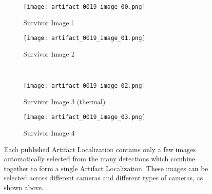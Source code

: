 \begin{figure}
	\centering
	\begin{subfigure}{0.45\textwidth}
		\texttt{[image: artifact\_0019\_image\_00.png]}
		\caption{Survivor Image 1}
		\label{survivor_image_1}
	\end{subfigure}		
	\hfill
	\begin{subfigure}{0.45\textwidth}
		\texttt{[image: artifact\_0019\_image\_01.png]}
		\caption{Survivor Image 2}
		\label{survivor_image_2}
	\end{subfigure}
	\\
	\begin{subfigure}{0.45\textwidth}
		\texttt{[image: artifact\_0019\_image\_02.png]}
		\caption{Survivor Image 3 (thermal)}
		\label{survivor_image_3}
	\end{subfigure}
	\hfill
	\begin{subfigure}{0.45\textwidth}
		\texttt{[image: artifact\_0019\_image\_03.png]}
		\caption{Survivor Image 4}
		\label{survivor_image_4}
	\end{subfigure}		
	\caption[Automatically selected images from Artifact Localizations]{Each published Artifact Localization contains only a few images automatically selected from the many detections which combine together to form a single Artifact Localization. These images can be selected across different cameras and different types of cameras, as shown above.}
	\label{automatically_selected_images}
\end{figure}

